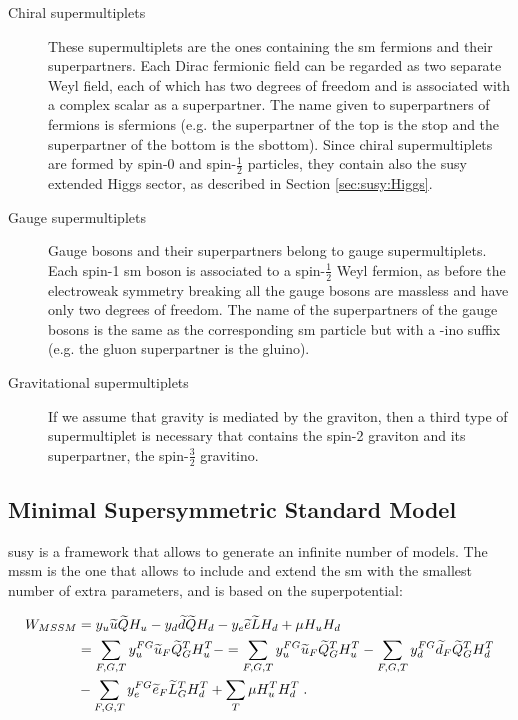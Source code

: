 \begin{description}
\item[Chiral supermultiplets] These supermultiplets are the ones containing the \gls{sm} fermions and their superpartners. Each Dirac fermionic field can be regarded as two separate Weyl field, each of which has two degrees of freedom and is associated with a complex scalar as a superpartner. The name given to superpartners of fermions is sfermions (e.g. the superpartner of the top is the stop and the superpartner of the bottom is the sbottom). Since chiral supermultiplets are formed by spin-0 and spin-$\frac{1}{2}$ particles, they contain also the \gls{susy} extended Higgs sector, as described in Section \ref{sec:susy:Higgs}.

\item[Gauge supermultiplets] Gauge bosons and their superpartners belong to gauge supermultiplets. Each spin-1 \gls{sm} boson is associated to a spin-$\frac{1}{2}$ Weyl fermion, as before the electroweak symmetry breaking all the gauge bosons are massless and have only two degrees of freedom. The name of the superpartners of the gauge bosons is the same as the corresponding \gls{sm} particle but with a -ino suffix (e.g. the gluon superpartner is the gluino). 

\item[Gravitational supermultiplets] If we assume that gravity is mediated by the graviton, then a third type of supermultiplet is necessary that contains the spin-2 graviton and its superpartner, the spin-$\frac{3}{2}$ gravitino.

\end{description}




\subsection{Minimal Supersymmetric Standard Model}
\label{sec:theo:mssm}

\gls{susy} is a framework that allows to generate an infinite number of models. The \gls{mssm} is the one that allows to include and extend the \gls{sm} with the smallest number of extra parameters, and is based on the superpotential:

\begin{equation}
\begin{aligned}
W_{MSSM} & = y_u \widetilde{u} \widetilde{Q} H_u - y_d \widetilde{d}\widetilde{Q} H_d - y_e \widetilde{e} \widetilde{L}H_d + \mu H_u H_d \\  
& = \sum_{F, G, T} y_u^{FG} \widetilde{u}_F \widetilde{Q}_G^T H_u^T -
 = \sum_{F, G, T} y_u^{FG} \widetilde{u}_F \widetilde{Q}_G^T H_u^T - 
   \sum_{F, G, T} y_d^{FG} \widetilde{d}_F \widetilde{Q}_G^T H_d^T   \\ 
   & -
   \sum_{F, G, T} y_e^{FG} \widetilde{e}_F\widetilde{L}_G^T H_d^T  +
   \sum_{T} \mu H_u^T H_d^T \;.
\end{aligned}
\label{eq:WMMS}
\end{equation}

